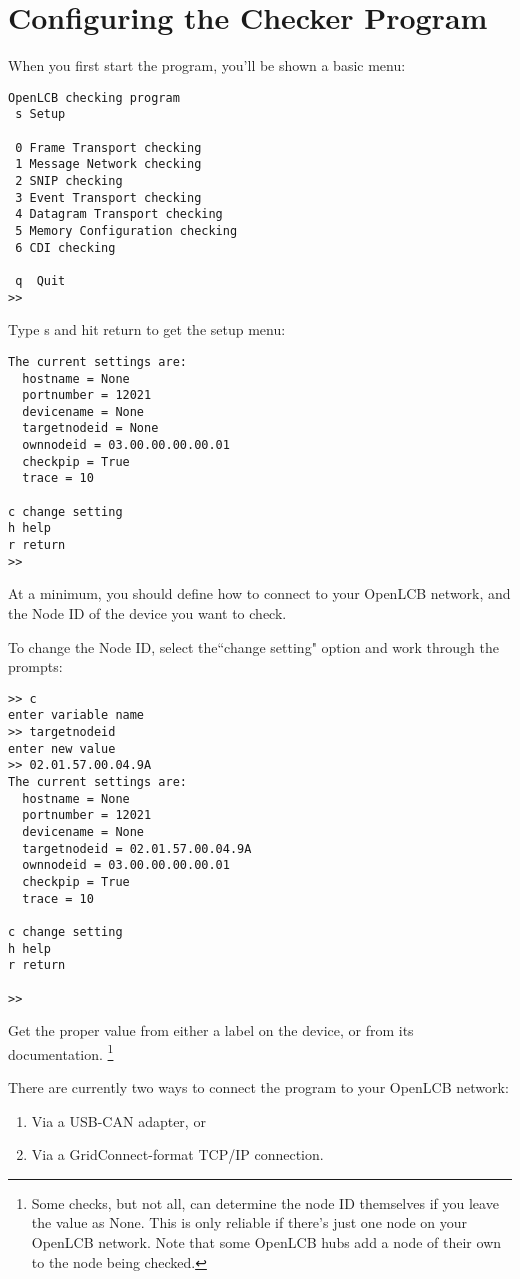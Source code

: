 \section{Configuring the Checker Program}

When you first start the program, you'll be shown a basic menu:

\begin{verbatim}
OpenLCB checking program
 s Setup

 0 Frame Transport checking
 1 Message Network checking
 2 SNIP checking
 3 Event Transport checking
 4 Datagram Transport checking
 5 Memory Configuration checking
 6 CDI checking
  
 q  Quit
>> 
\end{verbatim}

Type s and hit return to get the setup menu:

\begin{verbatim}
The current settings are:
  hostname = None
  portnumber = 12021
  devicename = None
  targetnodeid = None
  ownnodeid = 03.00.00.00.00.01
  checkpip = True
  trace = 10

c change setting
h help
r return
>> 
\end{verbatim}

At a minimum, you should define how to connect to your OpenLCB network,
and the Node ID of the device you want to check.  

To change the Node ID, select the``change setting" option and work through the prompts:

\begin{verbatim}
>> c
enter variable name
>> targetnodeid
enter new value
>> 02.01.57.00.04.9A
The current settings are:
  hostname = None
  portnumber = 12021
  devicename = None
  targetnodeid = 02.01.57.00.04.9A
  ownnodeid = 03.00.00.00.00.01
  checkpip = True
  trace = 10

c change setting
h help
r return

>> 
\end{verbatim}

Get the proper value from either a label on the device, or from its documentation.
\footnote{Some checks, but not all, can determine the node ID themselves if you leave
    the value as None. This is only reliable if there's just one node on your OpenLCB
    network.  Note that some OpenLCB hubs add a node of their own to the node
    being checked.}
    
There are currently two ways to connect the program to your OpenLCB network:
\begin{enumerate}
\item Via a USB-CAN adapter, or
\item Via a GridConnect-format TCP/IP connection.
\end{enumerate}


